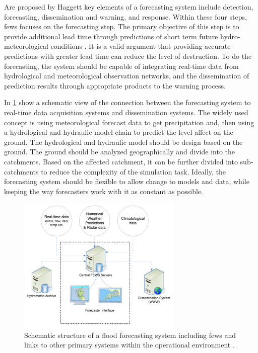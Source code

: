 Are proposed by Haggett \cite{Haggett1998AnWales} key elements of a forecasting system include detection, forecasting, dissemination and warning, and response. Within these four steps, \acrshort{fews} focuses on the forecasting step. The primary objective of this step is to provide additional lead time through predictions of short term future hydro-meteorological conditions \cite{Werner2005FloodCatchments}. It is a valid argument that providing accurate predictions with greater lead time can reduce the level of destruction. To do the forecasting, the system should be capable of integrating real-time data from hydrological and meteorological observation networks, and the dissemination of prediction results through appropriate products to the warning process.

In  \cref{fi:fews_schematic} show a schematic view of the connection between the forecasting system to real-time data acquisition systems and dissemination systems. The widely used concept is using meteorological forecast data to get precipitation and, then using a hydrological and hydraulic model chain to predict the level affect on the ground. The hydrological and hydraulic model should be design based on the ground. The ground should be analyzed geographically and divide into the catchments. Based on the affected catchment, it can be further divided into sub-catchments to reduce the complexity of the simulation task. Ideally, the forecasting system should be flexible to allow change to models and data, while keeping the way forecasters work with it as constant as possible.

\begin{figure}[htp]
    \centering
    \includegraphics[width=0.7\textwidth]{lit/fews/Schematic-structure-of-a-fl-ood-forecasting-system-showing-the-position-of-Delft-FEWS_W640.png}
    \caption[Schematic structure of a flood forecasting system including \acrshort{fews} and links to other primary systems within the operational environment]{Schematic structure of a flood forecasting system including \acrshort{fews} and links to other primary systems within the operational environment \cite{Werner2013TheSystem}.}
    \label{fi:fews_schematic}
\end{figure}

